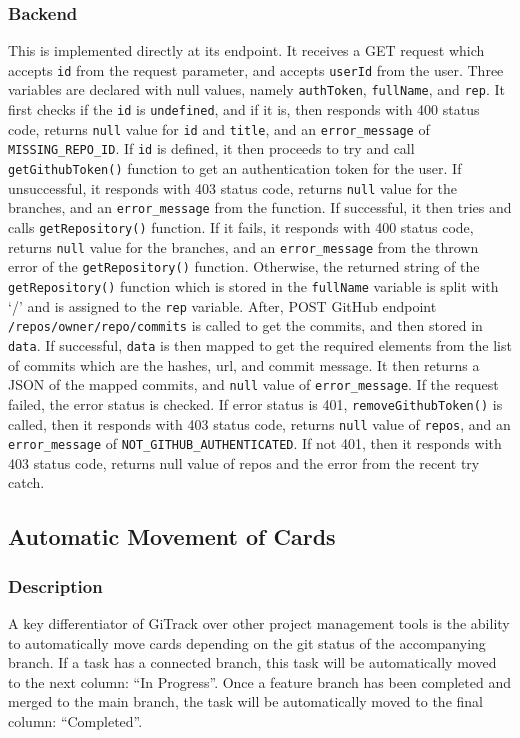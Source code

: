 \documentclass{article}
\def\code#1{\texttt{#1}}
\begin{document}
\subsubsection{Backend}
This is implemented directly at its endpoint. It receives a GET request which
accepts \code{id} from the request parameter, and accepts \code{userId} from the
user. Three variables are declared with null values, namely \code{authToken},
\code{fullName}, and \code{rep}. It first checks if the \code{id} is
\code{undefined}, and if it is, then responds with 400 status code, returns
\code{null} value for \code{id} and \code{title}, and an \code{error\_message}
of \code{MISSING\_REPO\_ID}. If \code{id} is defined, it then proceeds to try
and call \code{getGithubToken()} function to get an authentication token for the
user. If unsuccessful, it responds with 403 status code, returns \code{null}
value for the branches, and an \code{error\_message} from the function. If
successful, it then tries and calls \code{getRepository()} function. If it
fails, it responds with 400 status code, returns \code{null} value for the
branches, and an \code{error\_message} from the thrown error of the
\code{getRepository()} function. Otherwise, the returned string of the
\code{getRepository()} function which is stored in the \code{fullName} variable
is split with ‘/’ and is assigned to the \code{rep} variable. After, POST GitHub
endpoint \code{/repos/{owner}/{repo}/commits} is called to get the commits, and
then stored in \code{data}. If successful, \code{data} is then mapped to get the
required elements from the list of commits which are the hashes, url, and commit
message. It then returns a JSON of the mapped commits, and \code{null} value of
\code{error\_message}. If the request failed, the error status is checked. If
error status is 401, \code{removeGithubToken()} is called, then it responds with
403 status code, returns \code{null} value of \code{repos}, and an
\code{error\_message} of \code{NOT\_GITHUB\_AUTHENTICATED}. If not 401, then it
responds with 403 status code, returns null value of repos and the error from
the recent try catch.

\subsection{Automatic Movement of Cards}
\subsubsection{Description}
A key differentiator of GiTrack over other project management tools is the
ability to automatically move cards depending on the git status of the
accompanying branch. If a task has a connected branch, this task will be
automatically moved to the next column: “In Progress”. Once a feature branch has
been completed and merged to the main branch, the task will be automatically
moved to the final column: “Completed”.
\end{document}

